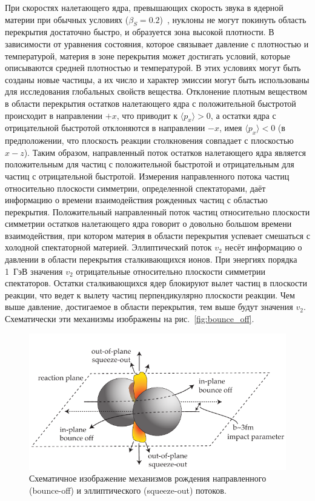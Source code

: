При скоростях налетающего ядра, превышающих скорость звука в ядерной материи при обычных условиях ($\beta_S=0.2$)~\cite{Weber:1998aa}, нуклоны не могут покинуть область перекрытия достаточно быстро, и образуется зона высокой плотности.
В зависимости от уравнения состояния, которое связывает давление с плотностью и температурой, материя в зоне перекрытия может достигать условий, которые описываются средней плотностью и температурой.
В этих условиях могут быть созданы новые частицы, а их число и характер эмиссии могут быть использованы для исследования глобальных свойств вещества.
Отклонение плотным веществом в области перекрытия остатков налетающего ядра с положительной быстротой происходит в направлении $+x$, что приводит к $\langle p_x \rangle  > 0$, а остатки ядра с отрицательной быстротой отклоняются в направлении $-x$, имея $\langle p_x \rangle < 0$ (в предположении, что плоскость реакции столкновения совпадает с плоскостью $x-z$).
Таким образом, направленный поток остатков налетающего ядра является положительным для частиц с положительной быстротой и отрицательным для частиц с отрицательной быстротой.
Измерения направленного потока частиц относительно плоскости симметрии, определенной спектаторами, даёт информацию о времени взаимодействия рожденных частиц с областью перекрытия.
Положительный направленный поток частиц относительно плоскости симметрии остатков налетающего ядра говорит о довольно большом времени взаимодействия, при котором материя в области перекрытия успевает смешаться с холодной спектаторной материей.
Эллиптический поток $v_2$ несёт информацию о давлении в области перекрытия сталкивающихся ионов.
При энергиях порядка 1~ГэВ значения $v_2$ отрицательные относительно плоскости симметрии спектаторов.
Остатки сталкивающихся ядер блокируют вылет частиц в плоскости реакции, что ведет к вылету частиц перпендикулярно плоскости реакции.
Чем выше давление, достигаемое в области перекрытия, тем выше будут значения $v_2$.
Схематически эти механизмы изображены на рис.~\ref{fig:bounce_off}.
%
\begin{figure}[ht]
\begin{center}
    \includegraphics[width=0.75\linewidth]{images/flow1.png}
    \caption{Схематичное изображение механизмов рождения направленного (bounce-off) и эллиптического (squeeze-out) потоков.}
    \label{fig:flow1}
\end{center}
\end{figure}
%


